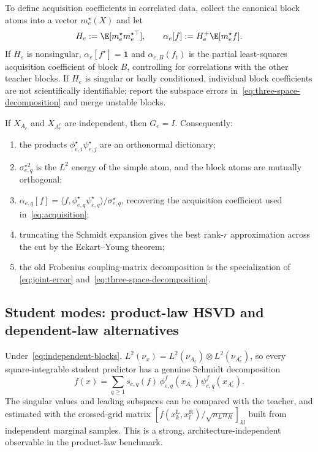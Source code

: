 To define acquisition coefficients in correlated data, collect the canonical block atoms into a
vector $m_e^\star(X)$ and let
\begin{equation}\label{eq:block-regression}
 H_e:=\E[m_e^\star m_e^{\star\top}],
 \qquad
 \alpha_e[f]:=H_e^+\E[m_e^\star f].
\end{equation}
If $H_e$ is nonsingular, $\alpha_e[f^\star]=\mathbf 1$ and $\alpha_{e,B}(f_t)$ is the partial
least-squares acquisition coefficient of block $B$, controlling for correlations with the other
teacher blocks.  If $H_e$ is singular or badly conditioned, individual block coefficients are not
scientifically identifiable; report the subspace errors in~\eqref{eq:three-space-decomposition}
and merge unstable blocks.

\begin{corollary}\label{prop:atoms}
If $X_{A_e}$ and $X_{A_e^c}$ are independent, then $G_e=I$.  Consequently:
\begin{enumerate}[label=(\roman*),nosep]
\item the products $\phi_{e,i}^\star\psi_{e,j}^\star$ are an orthonormal dictionary;
\item $\sigma_{e,q}^{\star2}$ is the $L^2$ energy of the simple atom, and the block atoms are
      mutually orthogonal;
\item $\alpha_{e,q}[f]=\langle f,\phi_{e,q}^\star\psi_{e,q}^\star\rangle/\sigma_{e,q}^\star$,
      recovering the acquisition coefficient used in~\eqref{eq:acquisition};
\item truncating the Schmidt expansion gives the best rank-$r$ approximation across the cut by
      the Eckart--Young theorem;
\item the old Frobenius coupling-matrix decomposition is the specialization of
      \eqref{eq:joint-error} and~\eqref{eq:three-space-decomposition}.
\end{enumerate}
\end{corollary}

\subsection{Student modes: product-law HSVD and dependent-law alternatives}\label{sec:student-fsvd}

Under~\eqref{eq:independent-blocks},
$L^2(\nu_x)=L^2(\nu_{A_e})\otimes L^2(\nu_{A_e^c})$, so every square-integrable student predictor
has a genuine Schmidt decomposition
\begin{equation}\label{eq:student-fsvd}
 f(x)=\sum_{q\ge1}s_{e,q}(f)\,\phi^f_{e,q}(x_{A_e})\psi^f_{e,q}(x_{A_e^c}).
\end{equation}
The singular values and leading subspaces can be compared with the teacher, and estimated with the
crossed-grid matrix
$[f(x_k^{\mathrm L},x_l^{\mathrm R})/\sqrt{n_Ln_R}]_{kl}$ built from independent marginal
samples.  This is a strong, architecture-independent observable in the product-law benchmark.

